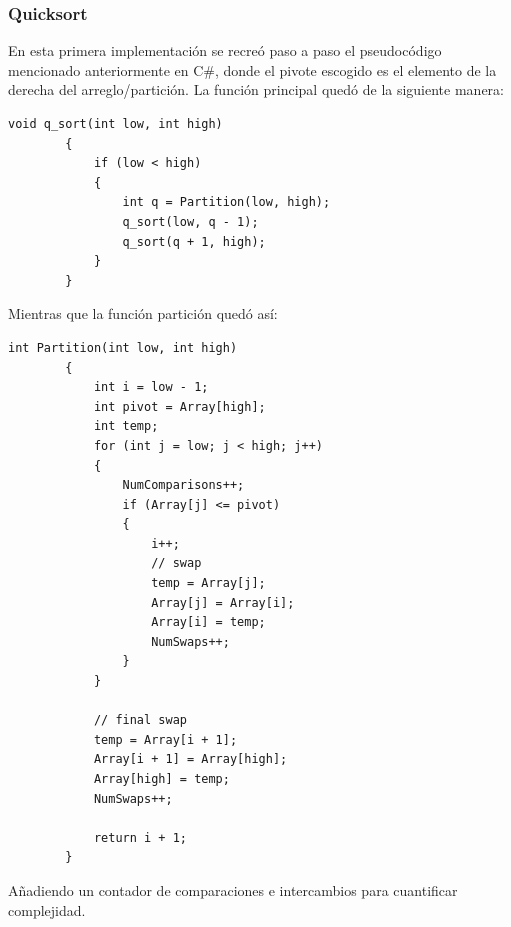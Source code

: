 \documentclass[conference]{IEEEtran}
\begin{document}
\subsubsection{Quicksort}
En esta primera implementación se recreó paso a paso el pseudocódigo mencionado anteriormente en C\#, donde el pivote escogido es el elemento de la derecha del arreglo/partición.
La función principal quedó de la siguiente manera:

\begin{verbatim}
void q_sort(int low, int high)
        {
            if (low < high)
            {
                int q = Partition(low, high);
                q_sort(low, q - 1);
                q_sort(q + 1, high);
            }
        }
\end{verbatim}

Mientras que la función partición quedó así:

\begin{verbatim}
int Partition(int low, int high)
        {
            int i = low - 1;
            int pivot = Array[high];
            int temp;
            for (int j = low; j < high; j++)
            {
                NumComparisons++;
                if (Array[j] <= pivot)
                {
                    i++;
                    // swap
                    temp = Array[j];
                    Array[j] = Array[i];
                    Array[i] = temp;
                    NumSwaps++;
                }
            }

            // final swap
            temp = Array[i + 1];
            Array[i + 1] = Array[high];
            Array[high] = temp;
            NumSwaps++;

            return i + 1;
        }
\end{verbatim}

Añadiendo un contador de comparaciones e intercambios para cuantificar complejidad.
\end{document}
